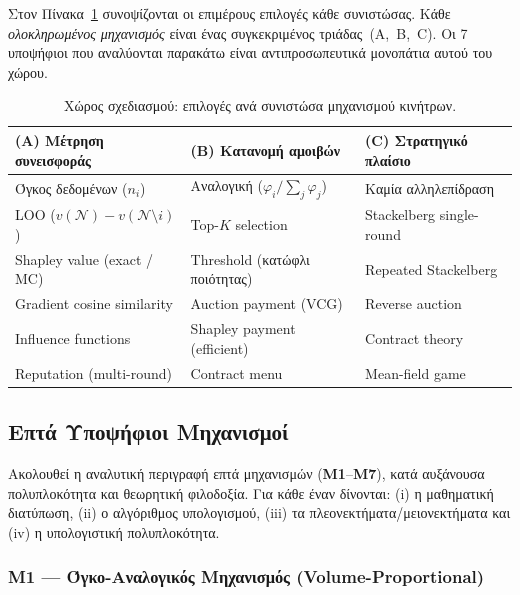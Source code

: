 Στον Πίνακα~\ref{tab:inc_components} συνοψίζονται οι επιμέρους επιλογές κάθε συνιστώσας. Κάθε
\emph{ολοκληρωμένος μηχανισμός} είναι ένας συγκεκριμένος τριάδας~(A,~B,~C). Οι 7 υποψήφιοι που
αναλύονται παρακάτω είναι αντιπροσωπευτικά μονοπάτια αυτού του χώρου.

\begin{table}[H]
    \centering
    \caption{Χώρος σχεδιασμού: επιλογές ανά συνιστώσα μηχανισμού κινήτρων.}
    \label{tab:inc_components}
    \footnotesize
    \begin{tabular}{p{} p{} p{}}
        \toprule
        \textbf{(A) Μέτρηση συνεισφοράς} & \textbf{(B) Κατανομή αμοιβών} & \textbf{(C) Στρατηγικό πλαίσιο} \\
        \midrule
        Όγκος δεδομένων ($n_i$) & Αναλογική ($\varphi_i / \sum_j \varphi_j$) & Καμία αλληλεπίδραση \\
        LOO ($v(\mathcal N) - v(\mathcal N \setminus i)$) & Top-$K$ selection & Stackelberg single-round \\
        Shapley value (exact / MC) & Threshold (κατώφλι ποιότητας) & Repeated Stackelberg \\
        Gradient cosine similarity & Auction payment (VCG) & Reverse auction \\
        Influence functions & Shapley payment (efficient) & Contract theory \\
        Reputation (multi-round) & Contract menu & Mean-field game \\
        \bottomrule
    \end{tabular}
\end{table}

\subsection{Επτά Υποψήφιοι Μηχανισμοί}
\label{subsec:inc_candidates}

Ακολουθεί η αναλυτική περιγραφή επτά μηχανισμών (\textbf{M1}--\textbf{M7}), κατά αυξάνουσα
πολυπλοκότητα και θεωρητική φιλοδοξία. Για κάθε έναν δίνονται: (i) η μαθηματική διατύπωση, (ii) ο
αλγόριθμος υπολογισμού, (iii) τα πλεονεκτήματα/μειονεκτήματα και (iv) η υπολογιστική πολυπλοκότητα.

\subsubsection{M1 — Όγκο-Αναλογικός Μηχανισμός (Volume-Proportional)}
\label{subsubsec:M1_volume}

